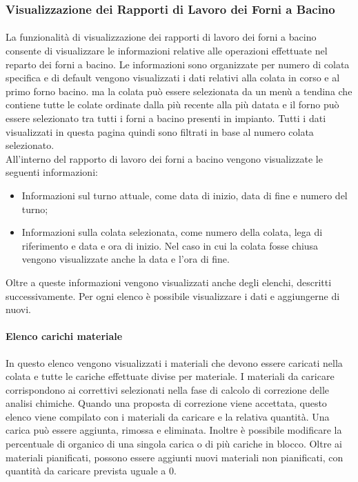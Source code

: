   \subsubsection{Visualizzazione dei Rapporti di Lavoro dei Forni a Bacino}
  \paragraph{}
  La funzionalità di visualizzazione dei rapporti di lavoro dei forni a bacino consente di visualizzare 
  le informazioni relative alle operazioni effettuate nel reparto dei forni a bacino. Le informazioni sono 
  organizzate per numero di colata specifica e di default vengono visualizzati i dati relativi alla colata in corso e al primo 
  forno bacino. ma la colata può essere selezionata da un menù a tendina che contiene tutte le colate ordinate 
  dalla più recente alla più datata e il forno può essere selezionato tra tutti i forni a bacino presenti in 
  impianto. Tutti i dati visualizzati in questa pagina quindi sono filtrati in base al numero colata selezionato.\\
  All’interno del rapporto di lavoro dei forni a bacino vengono visualizzate le seguenti informazioni:
  \begin{itemize}
    \item Informazioni sul turno attuale, come data di inizio, data di fine e numero del turno;
    \item Informazioni sulla colata selezionata, come numero della colata, lega di riferimento e data e ora 
    di inizio. Nel caso in cui la colata fosse chiusa vengono visualizzate anche la data e l'ora di fine.
  \end{itemize}
  Oltre a queste informazioni vengono visualizzati anche degli elenchi, descritti successivamente. 
  Per ogni elenco è possibile visualizzare i dati e aggiungerne di nuovi.
  \paragraph{Elenco carichi materiale}
  In questo elenco vengono visualizzati i materiali che devono essere caricati nella colata e 
  tutte le cariche effettuate divise per materiale. I materiali da caricare corrispondono ai correttivi 
  selezionati nella fase di calcolo di correzione delle analisi chimiche. Quando una proposta di correzione 
  viene accettata, questo elenco viene compilato con i materiali da caricare e la relativa quantità. 
  Una carica può essere aggiunta, rimossa e eliminata. Inoltre è possibile modificare la percentuale 
  di organico di una singola carica o di più cariche in blocco. Oltre ai materiali pianificati, possono 
  essere aggiunti nuovi materiali non pianificati, con quantità da caricare prevista uguale a 0.

